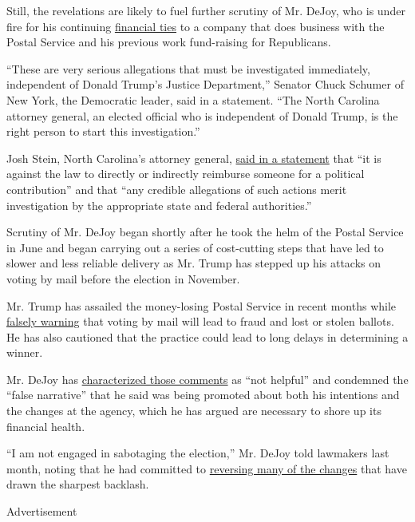 Still, the revelations are likely to fuel further scrutiny of Mr. DeJoy,
who is under fire for his continuing
\href{https://www.nytimes3xbfgragh.onion/2020/09/02/us/politics/louis-dejoy-usps-paid.html}{financial
ties} to a company that does business with the Postal Service and his
previous work fund-raising for Republicans.

``These are very serious allegations that must be investigated
immediately, independent of Donald Trump's Justice Department,'' Senator
Chuck Schumer of New York, the Democratic leader, said in a statement.
``The North Carolina attorney general, an elected official who is
independent of Donald Trump, is the right person to start this
investigation.''

Josh Stein, North Carolina's attorney general,
\href{https://twitter.com/JoshStein_/status/1302678272493449216}{said in
a statement} that ``it is against the law to directly or indirectly
reimburse someone for a political contribution'' and that ``any credible
allegations of such actions merit investigation by the appropriate state
and federal authorities.''

Scrutiny of Mr. DeJoy began shortly after he took the helm of the Postal
Service in June and began carrying out a series of cost-cutting steps
that have led to slower and less reliable delivery as Mr. Trump has
stepped up his attacks on voting by mail before the election in
November.

Mr. Trump has assailed the money-losing Postal Service in recent months
while
\href{https://www.nytimes3xbfgragh.onion/article/mail-in-voting-explained.html}{falsely
warning} that voting by mail will lead to fraud and lost or stolen
ballots. He has also cautioned that the practice could lead to long
delays in determining a winner.

Mr. DeJoy has
\href{https://www.nytimes3xbfgragh.onion/2020/08/24/us/politics/louis-dejoy-post-office-hearing.html}{characterized
those comments} as ``not helpful'' and condemned the ``false narrative''
that he said was being promoted about both his intentions and the
changes at the agency, which he has argued are necessary to shore up its
financial health.

``I am not engaged in sabotaging the election,'' Mr. DeJoy told
lawmakers last month, noting that he had committed to
\href{https://www.nytimes3xbfgragh.onion/2020/08/19/business/economy/postal-service-changes-dejoy.html}{reversing
many of the changes} that have drawn the sharpest backlash.

Advertisement

